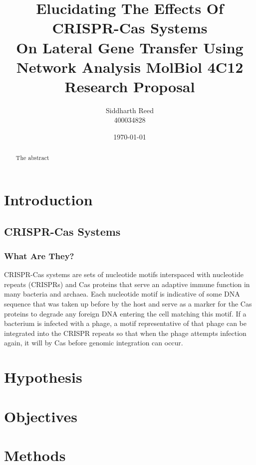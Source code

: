 \documentclass[12pt,letter]{article}
\begin{document}
\linespread{1.25} %
\title{Elucidating The Effects Of CRISPR-Cas Systems\\
        On Lateral Gene Transfer Using Network Analysis
       \large MolBiol 4C12 Research Proposal}
\author{Siddharth Reed\\ 400034828}
\date{\today}
\maketitle
\newpage
\begin{abstract}
    The abstract
\end{abstract}
\section*{Introduction} %
\subsection*{CRISPR-Cas Systems}
\subsubsection*{What Are They?}
CRISPR-Cas systems are sets of nucleotide motifs interspaced with nucleotide repeats (CRISPRs) and Cas proteins that serve an adaptive immune function in many bacteria and archaea\cite{evocas}.
Each nucleotide motif is indicative of some DNA sequence that was taken up before by the host and serve as a marker for the Cas proteins to degrade any foreign  DNA entering the cell matching this motif.
If a bacterium is infected with a phage, a motif representative of that phage can be integrated into the CRISPR repeats so that when the phage attempts infection again, it will by Cas before genomic integration can occur.
\section*{Hypothesis} %
\section*{Objectives} %
\section*{Methods} %
\end{document}
